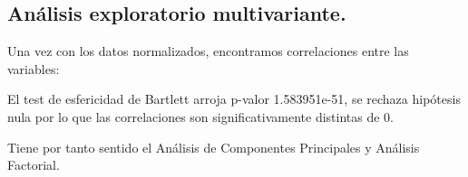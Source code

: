 \documentclass[11pt,a4paper]{article}
\begin{document}
    \subsection{Análisis exploratorio multivariante.}
    Una vez con los datos normalizados, encontramos correlaciones entre las variables:
	\begin{figure}[H]
		\centering
  \hfill
	\end{figure}
	El test de esfericidad de Bartlett arroja p-valor 1.583951e-51, se rechaza hipótesis nula por lo que las correlaciones son significativamente distintas de 0.
	
	Tiene por tanto sentido el Análisis de Componentes Principales y Análisis Factorial.
\end{document}
